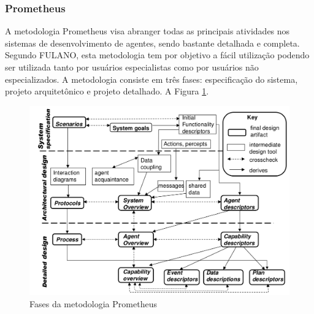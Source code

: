 % 
% 

\subsubsection{Prometheus}

A metodologia Prometheus visa abranger todas as principais atividades nos sistemas de desenvolvimento de agentes, sendo bastante detalhada e completa. Segundo FULANO, esta metodologia tem por objetivo a fácil utilização podendo ser utilizada tanto por usuários especialistas como por usuários não especializados. A metodologia consiste em três fases: especificação do sistema, projeto arquitetônico e projeto detalhado. A Figura \ref{fig:f_prometheus}.
% 
% 

\begin{figure}[ht]
\centering
\includegraphics[scale=0.3]{imagens/fases_prometheus.png}
\caption{Fases da metodologia Prometheus }
\label{fig:f_prometheus}
\end{figure}


